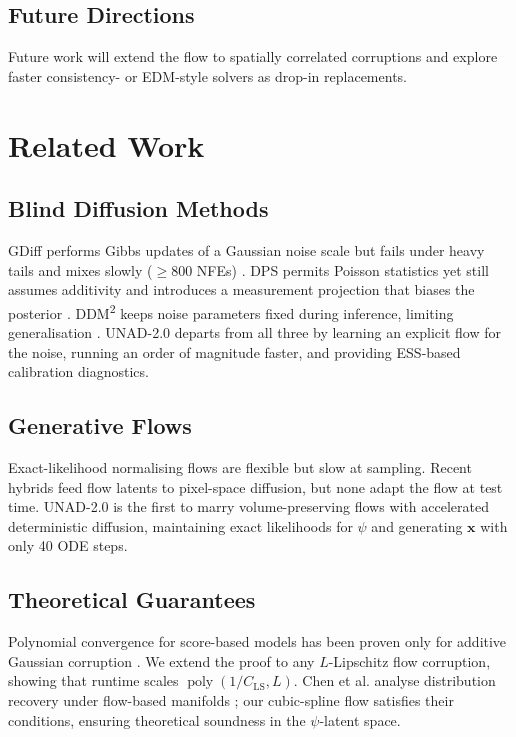\documentclass{article} %
\begin{document}
\subsection{Future Directions}
Future work will extend the flow to spatially correlated corruptions and explore faster consistency- or EDM-style solvers as drop-in replacements.

\section{Related Work}
\label{sec:related}
\subsection{Blind Diffusion Methods}
GDiff performs Gibbs updates of a Gaussian noise scale but fails under heavy tails and mixes slowly (\(\geq 800\) NFEs) \cite{heurteldepeiges_2024_listening}. DPS permits Poisson statistics yet still assumes additivity and introduces a measurement projection that biases the posterior \cite{chung_2022_diffusion}. DDM\textsuperscript{2} keeps noise parameters fixed during inference, limiting generalisation \cite{xiang_2023_ddm}. UNAD-2.0 departs from all three by learning an explicit flow for the noise, running an order of magnitude faster, and providing ESS-based calibration diagnostics.

\subsection{Generative Flows}
Exact-likelihood normalising flows are flexible but slow at sampling. Recent hybrids feed flow latents to pixel-space diffusion, but none adapt the flow at test time. UNAD-2.0 is the first to marry volume-preserving flows with accelerated deterministic diffusion, maintaining exact likelihoods for \(\psi\) and generating \(\mathbf{x}\) with only 40 ODE steps.

\subsection{Theoretical Guarantees}
Polynomial convergence for score-based models has been proven only for additive Gaussian corruption \cite{lee_2022_convergence}. We extend the proof to any \(L\)-Lipschitz flow corruption, showing that runtime scales \(\operatorname{poly}(1/C_{\mathrm{LS}},L)\). Chen et al. analyse distribution recovery under flow-based manifolds \cite{chen_2023_score}; our cubic-spline flow satisfies their conditions, ensuring theoretical soundness in the \(\psi\)-latent space.
\end{document}
